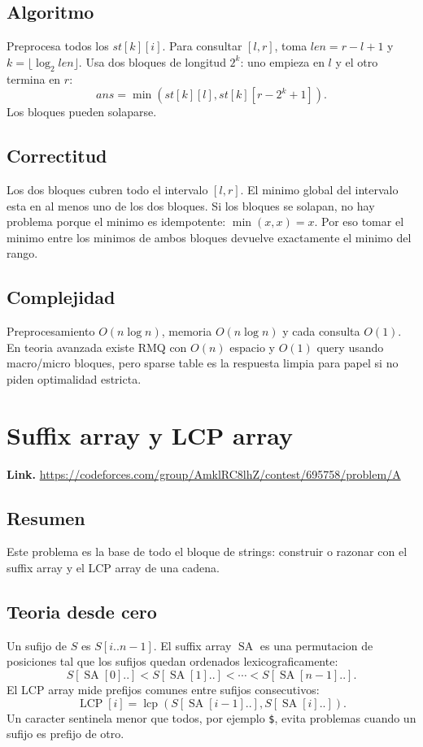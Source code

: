 \documentclass[10pt]{article}
\newcommand{\bigO}{O}
\newcommand{\SA}{\operatorname{SA}}
\newcommand{\LCP}{\operatorname{LCP}}
\begin{document}
\subsection*{Algoritmo}
Preprocesa todos los $st[k][i]$. Para consultar $[l,r]$, toma
$len=r-l+1$ y $k=\lfloor\log_2 len\rfloor$. Usa dos bloques de longitud $2^k$:
uno empieza en $l$ y el otro termina en $r$:
\[
ans = \min(st[k][l], st[k][r-2^k+1]).
\]
Los bloques pueden solaparse.

\subsection*{Correctitud}
Los dos bloques cubren todo el intervalo $[l,r]$. El minimo global del intervalo
esta en al menos uno de los dos bloques. Si los bloques se solapan, no hay
problema porque el minimo es idempotente: $\min(x,x)=x$. Por eso tomar el minimo
entre los minimos de ambos bloques devuelve exactamente el minimo del rango.

\subsection*{Complejidad}
Preprocesamiento $\bigO(n\log n)$, memoria $\bigO(n\log n)$ y cada consulta
$\bigO(1)$. En teoria avanzada existe RMQ con $\bigO(n)$ espacio y $\bigO(1)$
query usando macro/micro bloques, pero sparse table es la respuesta limpia para
papel si no piden optimalidad estricta.

\clearpage
\section{Suffix array y LCP array}
\textbf{Link.} \url{https://codeforces.com/group/AmklRC8lhZ/contest/695758/problem/A}

\subsection*{Resumen}
Este problema es la base de todo el bloque de strings: construir o razonar con
el suffix array y el LCP array de una cadena.

\subsection*{Teoria desde cero}
Un sufijo de $S$ es $S[i..n-1]$. El suffix array $\SA$ es una permutacion de
posiciones tal que los sufijos quedan ordenados lexicograficamente:
\[
S[\SA[0]..] < S[\SA[1]..] < \cdots < S[\SA[n-1]..].
\]
El LCP array mide prefijos comunes entre sufijos consecutivos:
\[
\LCP[i]=\operatorname{lcp}(S[\SA[i-1]..],S[\SA[i]..]).
\]
Un caracter sentinela menor que todos, por ejemplo \texttt{\$}, evita problemas
cuando un sufijo es prefijo de otro.
\end{document}
